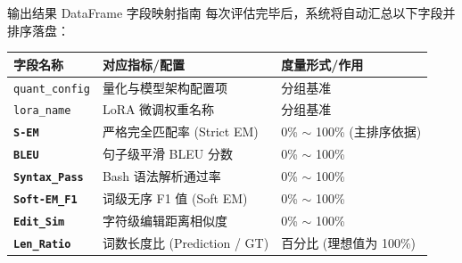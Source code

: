 \documentclass[aspectratio=169]{beamer}
\begin{document}
\begin{frame}{输出结果 DataFrame 字段映射指南}
    每次评估完毕后，系统将自动汇总以下字段并排序落盘：
    
    \vspace{0.2cm}
    \begin{table}
        \small
        \centering
        \begin{tabular}{lll}
            \toprule
            \textbf{字段名称} & \textbf{对应指标/配置} & \textbf{度量形式/作用} \\
            \midrule
            \texttt{quant\_config} & 量化与模型架构配置项 & 分组基准 \\
            \texttt{lora\_name} & LoRA 微调权重名称 & 分组基准 \\
            \textbf{\texttt{S-EM}} & 严格完全匹配率 (Strict EM) & 0\% $\sim$ 100\% (主排序依据) \\
            \textbf{\texttt{BLEU}} & 句子级平滑 BLEU 分数 & 0\% $\sim$ 100\% \\
            \textbf{\texttt{Syntax\_Pass}} & Bash 语法解析通过率 & 0\% $\sim$ 100\% \\
            \textbf{\texttt{Soft-EM\_F1}} & 词级无序 F1 值 (Soft EM) & 0\% $\sim$ 100\% \\
            \textbf{\texttt{Edit\_Sim}} & 字符级编辑距离相似度 & 0\% $\sim$ 100\% \\
            \textbf{\texttt{Len\_Ratio}} & 词数长度比 (Prediction / GT) & 百分比 (理想值为 100\%) \\
            \bottomrule
        \end{tabular}
    \end{table}
\end{frame}
\end{document}
